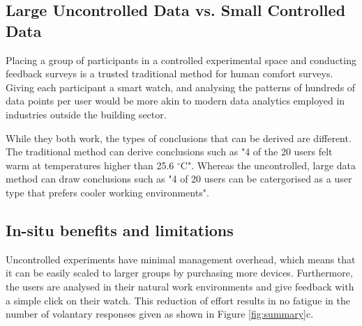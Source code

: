 
\subsection{Large Uncontrolled Data vs. Small Controlled Data}



Placing a group of participants in a controlled experimental space and conducting feedback surveys is a trusted traditional method for human comfort surveys. Giving each participant a smart watch, and analysing the patterns of hundreds of data points per user would be more akin to modern data analytics employed in industries outside the building sector. 

While they both work, the types of conclusions that can be derived are different. The traditional method can derive conclusions such as "4 of the 20 users felt warm at temperatures higher than 25.6 $^\circ$C". Whereas the uncontrolled, large data method can draw conclusions such as "4 of 20 users can be catergorised as a user type that prefers cooler working environments".



\subsection{In-situ benefits and limitations}

Uncontrolled experiments have minimal management overhead, which means that it can be easily scaled to larger groups by purchasing more devices. Furthermore, the users are analysed in their natural work environments and give feedback with a simple click on their watch. This reduction of effort results in no fatigue in the number of volantary responses given as shown in Figure \ref{fig:summary}c.

